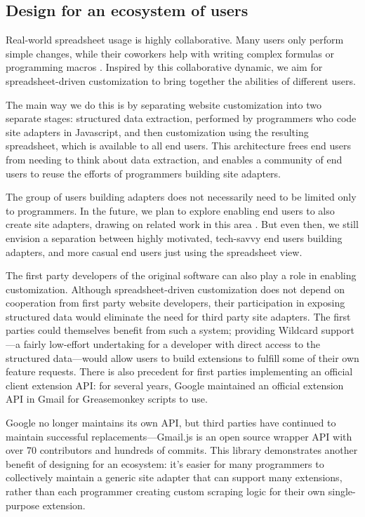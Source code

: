 \documentclass[english]{programming}
\begin{document}
\hypertarget{design-for-an-ecosystem-of-users}{%
\subsection{Design for an ecosystem of
users}\label{design-for-an-ecosystem-of-users}}

Real-world spreadsheet usage is highly collaborative. Many users only
perform simple changes, while their coworkers help with writing complex
formulas or programming macros \autocite{nardi1990}. Inspired by this
collaborative dynamic, we aim for spreadsheet-driven customization to
bring together the abilities of different users.

The main way we do this is by separating website customization into two
separate stages: structured data extraction, performed by programmers
who code site adapters in Javascript, and then customization using the
resulting spreadsheet, which is available to all end users. This
architecture frees end users from needing to think about data
extraction, and enables a community of end users to reuse the efforts of
programmers building site adapters.

The group of users building adapters does not necessarily need to be
limited only to programmers. In the future, we plan to explore enabling
end users to also create site adapters, drawing on related work in this
area \autocite{chasins2018,huynh2006}. But even then, we still envision
a separation between highly motivated, tech-savvy end users building
adapters, and more casual end users just using the spreadsheet view.

The first party developers of the original software can also play a role
in enabling customization. Although spreadsheet-driven customization
does not depend on cooperation from first party website developers,
their participation in exposing structured data would eliminate the need
for third party site adapters. The first parties could themselves
benefit from such a system; providing Wildcard support---a fairly
low-effort undertaking for a developer with direct access to the
structured data---would allow users to build extensions to fulfill some
of their own feature requests. There is also precedent for first parties
implementing an official client extension API: for several years, Google
maintained an official extension API in Gmail for Greasemonkey scripts
to use.

Google no longer maintains its own API, but third parties have continued
to maintain successful replacements---Gmail.js \autocite{talwar2019} is
an open source wrapper API with over 70 contributors and hundreds of
commits. This library demonstrates another benefit of designing for an
ecosystem: it's easier for many programmers to collectively maintain a
generic site adapter that can support many extensions, rather than each
programmer creating custom scraping logic for their own single-purpose
extension.
\end{document}
